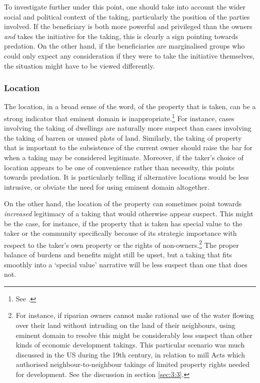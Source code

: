 To investigate further under this point, one should take into account the wider social and political context of the taking, particularly the position of the parties involved. If the beneficiary is both more powerful and privileged than the owners {\it and} takes the initiative for the taking, this is clearly a sign pointing towards predation. On the other hand, if the beneficiaries are marginalised groups who could only expect any consideration if they were to take the initiative themselves, the situation might have to be viewed differently. %

\subsubsection*{Location}

The location, in a broad sense of the word, of the property that is taken, can be a strong indicator that eminent domain is inappropriate.\footnote{See \cite[33-34]{gray11}.} For instance, cases involving the taking of dwellings are naturally more suspect than cases involving the taking of barren or unused plots of land. Similarly, the taking of property that is important to the subsistence of the current owner should raise the bar for when a taking may be considered legitimate. Moreover, if the taker's choice of location appears to be one of convenience rather than necessity, this points towards predation. It is particularly telling if alternative locations would be less intrusive, or obviate the need for using eminent domain altogether.


On the other hand, the location of the property can sometimes point towards {\it increased} legitimacy of a taking that would otherwise appear suspect. This might be the case, for instance, if the property that is taken has special value to the taker or the community specifically because of its strategic importance with respect to the taker's own property or the rights of non-owners.\footnote{For instance, if riparian owners cannot make rational use of the water flowing over their land without intruding on the land of their neighbours, using eminent domain to resolve this might be considerably less suspect than other kinds of economic development takings. This particular scenario was much discussed in the US during the 19th century, in relation to mill Acts which authorised neighbour-to-neighbour takings of limited property rights needed for development. See the discussion in section \ref{sec:3:3}.} The proper balance of burdens and benefits might still be upset, but a taking that fits smoothly into a `special value' narrative will be less suspect than one that does not.

